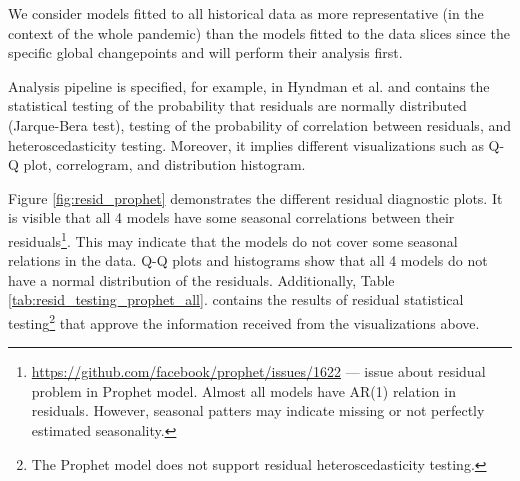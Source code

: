 We consider models fitted to all historical data as more representative (in the context of the whole pandemic) than the models fitted to the data slices since the specific global changepoints and will perform their analysis first.

Analysis pipeline is specified, for example, in Hyndman et al. \cite{Hyndman2018} and contains the statistical testing of the probability that residuals are normally distributed (Jarque-Bera test), testing of the probability of correlation between residuals, and heteroscedasticity testing. Moreover, it implies different visualizations such as Q-Q plot, correlogram, and distribution histogram.

Figure \ref{fig:resid_prophet} demonstrates the different residual diagnostic plots. It is visible that all 4 models have some seasonal correlations between their residuals\footnote{\url{https://github.com/facebook/prophet/issues/1622} --- issue about residual problem in Prophet model. Almost all models have AR(1) relation in residuals. However, seasonal patters may indicate missing or not perfectly estimated seasonality.}. This may indicate that the models do not cover some seasonal relations in the data. Q-Q plots and histograms show that all 4 models do not have a normal distribution of the residuals. Additionally, Table \ref{tab:resid_testing_prophet_all}. contains the results of residual statistical testing\footnote{The Prophet model does not support residual heteroscedasticity testing.} that approve the information received from the visualizations above.

